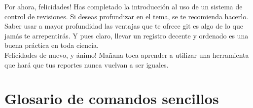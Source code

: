 \documentclass[10pt,letterpaper]{article}
\begin{document}
Por ahora, felicidades! Has completado la introducci\'on al uso de un sistema de control de revisiones. Si deseas profundizar en el tema, se te recomienda hacerlo. Saber usar a mayor profundidad las ventajas que te ofrece git es algo de lo que jam\'as te arrepentir\'as. Y pues claro, llevar un registro decente y ordenado es una buena pr\'actica en toda ciencia.\\

Felicidades de nuevo, y \'animo! Ma\~nana toca aprender a utilizar una herramienta que har\'a que tus reportes nunca vuelvan a ser iguales.

\newpage

\section{Glosario de comandos sencillos}
\end{document}
